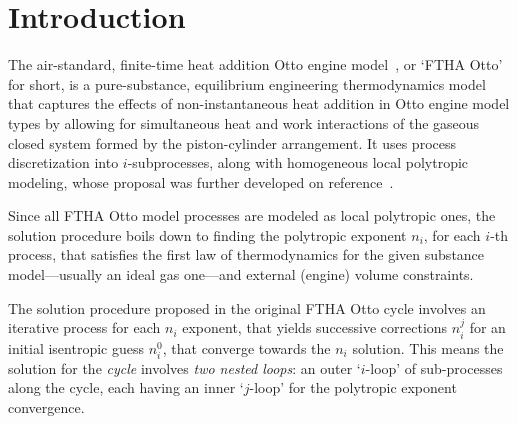 \section{Introduction}

    The air-standard, finite-time heat addition Otto engine model~\cite{2017-NaaktgeborenC-IntJMechEngEduc}, or `FTHA Otto'  for
    short, is a pure-substance, equilibrium engineering thermodynamics model that captures the effects of non-instantaneous heat
    addition in Otto engine model types by allowing for simultaneous heat and work interactions of  the  gaseous  closed  system
    formed by the piston-cylinder arrangement. It uses process discretization  into  $i$-subprocesses,  along  with  homogeneous
    local        polytropic        modeling,        whose        proposal        was        further         developed         on
    reference~\cite{2020-NaaktgeborenC-Polytropic-engrXiv-rev02}.

    Since all FTHA Otto model processes are modeled as local polytropic ones, the solution procedure boils down to  finding  the
    polytropic exponent $n_i$, for each $i$-th process, that satisfies the first law of thermodynamics for the  given  substance
    model---usually an ideal gas one---and external (engine) volume constraints.

    The solution procedure proposed in the original FTHA Otto cycle involves an iterative process for each $n_i$ exponent,  that
    yields successive corrections $n_i^j$ for an initial isentropic guess $n_i^0$, that converge  towards  the  $n_i$  solution.
    This means the solution for the \emph{cycle} involves \emph{two nested loops}: an outer `$i$-loop'  of  sub-processes  along
    the cycle, each having an inner `$j$-loop' for the polytropic exponent convergence.


